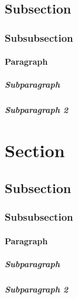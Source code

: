 \subsection{Subsection}
\subsubsection{Subsubsection}
\paragraph{Paragraph}
\subparagraph{Subparagraph}
\subparagraph{Subparagraph 2}
\newpage

\section{Section}
\lipsum[1]
\subsection{Subsection}
\lipsum[2]
\subsubsection{Subsubsection}
\lipsum[3]
\paragraph{Paragraph} \lipsum[4]
\subparagraph{Subparagraph}
\lipsum[5]
\subparagraph{Subparagraph 2}
\lipsum[6]
